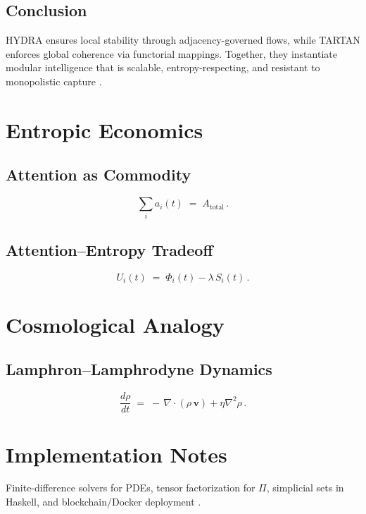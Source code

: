 \documentclass[12pt]{article}
\begin{document}
\subsection*{Conclusion}
HYDRA ensures local stability through adjacency-governed flows, while TARTAN enforces global coherence via functorial mappings. Together, they instantiate modular intelligence that is scalable, entropy-respecting, and resistant to monopolistic capture \citep{whitehead1978}.

\section*{Entropic Economics}
\subsection*{Attention as Commodity}
\[
\sum_i a_i(t) \;=\; A_{\text{total}} \, .
\]
\citep{shannon1948}

\subsection*{Attention–Entropy Tradeoff}
\[
U_i(t) \;=\; \Phi_i(t) - \lambda\, S_i(t) \, .
\]
\citep{hanson2003}

\section*{Cosmological Analogy}
\subsection*{Lamphron–Lamphrodyne Dynamics}
\[
\frac{d\rho}{dt} \;=\; -\,\nabla \cdot (\rho\,\mathbf{v}) + \eta \nabla^2 \rho \, .
\]
\citep{whitehead1978}

\section*{Implementation Notes}
Finite-difference solvers for PDEs, tensor factorization for \(\Pi\), simplicial sets in Haskell, and blockchain/Docker deployment \citep{bird1988, milewski2018}.




\end{document}
